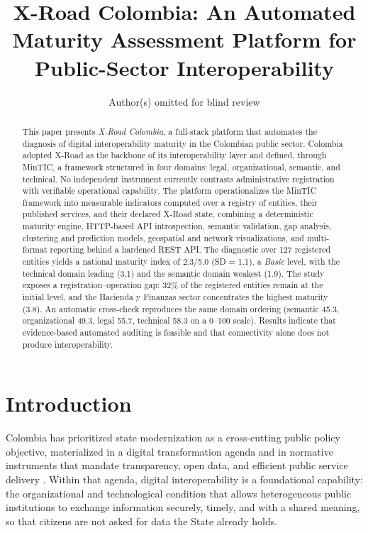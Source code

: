 \documentclass[runningheads]{llncs}
\author{Author(s) omitted for blind review}
\institute{Institution omitted for blind review}
\begin{document}
\title{X-Road Colombia: An Automated Maturity Assessment Platform for
Public-Sector Interoperability}


\maketitle

\begin{abstract}
This paper presents \emph{X-Road Colombia}, a full-stack platform that
automates the diagnosis of digital interoperability maturity in the
Colombian public sector. Colombia adopted X-Road as the backbone of its
interoperability layer and defined, through MinTIC, a framework structured
in four domains: legal, organizational, semantic, and technical. No
independent instrument currently contrasts administrative registration with
verifiable operational capability. The platform operationalizes the MinTIC
framework into measurable indicators computed over a registry of entities,
their published services, and their declared X-Road state, combining a
deterministic maturity engine, HTTP-based API introspection, semantic
validation, gap analysis, clustering and prediction models, geospatial and
network visualizations, and multi-format reporting behind a hardened REST
API. The diagnostic over 127 registered entities yields a national maturity
index of 2.3/5.0 (SD = 1.1), a \emph{Basic} level, with the technical domain
leading (3.1) and the semantic domain weakest (1.9). The study exposes a
registration--operation gap: 32\% of the registered entities remain at the
initial level, and the Hacienda y Finanzas sector concentrates the highest
maturity (3.8). An automatic cross-check reproduces the same domain ordering
(semantic 45.3, organizational 49.3, legal 55.7, technical 58.3 on a 0--100
scale). Results indicate that evidence-based automated auditing is feasible
and that connectivity alone does not produce interoperability.

\end{abstract}

\section{Introduction}
\label{sec:intro}

Colombia has prioritized state modernization as a cross-cutting public
policy objective, materialized in a digital transformation agenda and in
normative instruments that mandate transparency, open data, and efficient
public service delivery \cite{conpes3975,ley1712,decreto1078}. Within that
agenda, digital interoperability is a foundational capability: the
organizational and technological condition that allows heterogeneous public
institutions to exchange information securely, timely, and with a shared
meaning, so that citizens are not asked for data the State already holds.
\end{document}
